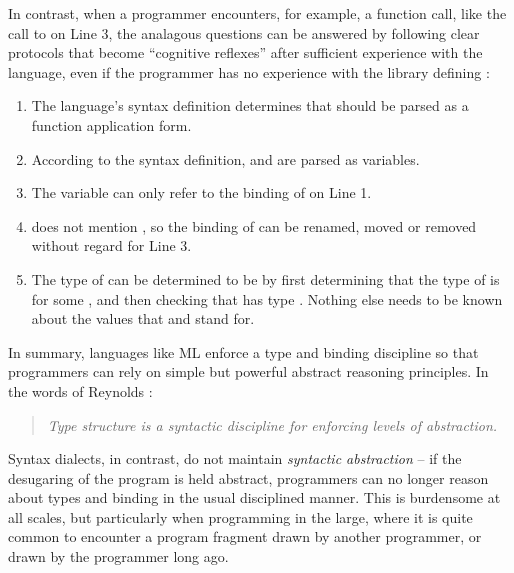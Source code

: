 In contrast, when a programmer encounters, for example, a function call, like the call to  on Line 3, the analagous questions can be answered by following clear protocols that become ``cognitive reflexes'' after sufficient experience with the language, even if the programmer has no experience with the library defining :
\begin{enumerate}
\item The language's syntax definition determines that  should be parsed as a function application form.
\item According to the syntax definition,  and  are parsed as variables.
\item The variable  can only refer to the binding of  on Line 1.
\item {} does not mention , so the binding of  can be renamed, moved or removed without regard for Line 3.
\item The type of  can be determined to be  by first determining that the type of  is  for some , and then checking that  has type . Nothing else needs to be known about the values that  and  stand for. 
\end{enumerate}

In summary, languages like ML enforce a type and binding discipline so that programmers can rely on simple but powerful abstract reasoning principles. In the words of Reynolds \cite{B304}:
\begin{quote}
\emph{Type structure is a syntactic discipline for enforcing levels of abstraction.}
\end{quote}
\noindent
Syntax dialects, in contrast, do not maintain \emph{syntactic abstraction} -- if the desugaring of the program is held abstract, programmers can no longer reason about types and binding in the usual disciplined manner. This is burdensome at all scales, but particularly when programming in the large, where it is quite common to encounter a program fragment drawn by another programmer, or drawn by the programmer long ago.


